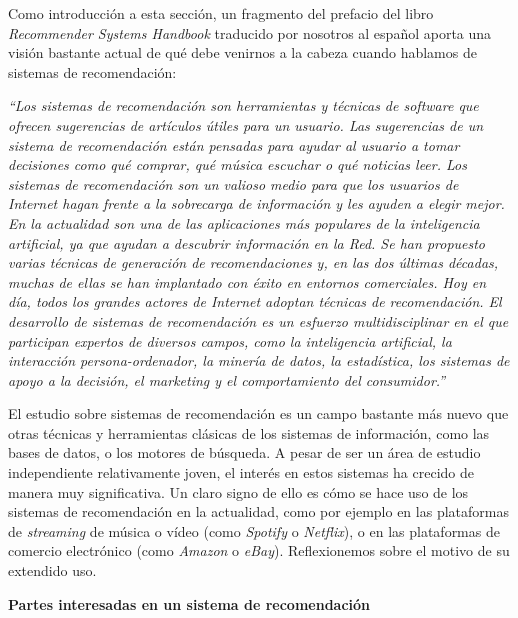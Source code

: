 Como introducción a esta sección, un fragmento del prefacio del libro \textit{Recommender Systems Handbook} \cite{recommender_handbook}
traducido por nosotros al español aporta una visión bastante actual de qué debe venirnos a la cabeza cuando hablamos de sistemas de recomendación:

\textit{``Los sistemas de recomendación son herramientas y técnicas de software que ofrecen sugerencias de artículos 
útiles para un usuario. Las sugerencias de un sistema de recomendación están pensadas para ayudar al usuario a tomar 
decisiones como qué comprar, qué música escuchar o qué noticias leer. Los sistemas de recomendación son un valioso medio
 para que los usuarios de Internet hagan frente a la sobrecarga de información y les ayuden a elegir mejor. En la 
 actualidad son una de las aplicaciones más populares de la inteligencia artificial, ya que ayudan a descubrir información
 en la Red. Se han propuesto varias técnicas de generación de recomendaciones y, en las dos últimas décadas, muchas de
 ellas se han implantado con éxito en entornos comerciales. Hoy en día, todos los grandes actores de Internet adoptan técnicas de
 recomendación. El desarrollo de sistemas de recomendación es un esfuerzo multidisciplinar en el que participan expertos 
 de diversos campos, como la inteligencia artificial, la interacción persona-ordenador, la minería de datos, la estadística, 
 los sistemas de apoyo a la decisión, el marketing y el comportamiento del consumidor.''}

El estudio sobre sistemas de recomendación es un campo bastante más nuevo que otras técnicas y herramientas clásicas de los sistemas de información, 
como las bases de datos, o los motores de búsqueda. A pesar de ser un área de estudio independiente relativamente joven, el interés en estos sistemas
ha crecido de manera muy significativa. Un claro signo de ello es cómo se hace uso de los sistemas de recomendación en la actualidad,
como por ejemplo en las plataformas de \textit{streaming} de música o vídeo (como \textit{Spotify} o \textit{Netflix}), o en las plataformas de
comercio electrónico (como \textit{Amazon} o \textit{eBay}). Reflexionemos sobre el motivo de su extendido uso. 

\textbf{Partes interesadas en un sistema de recomendación}

